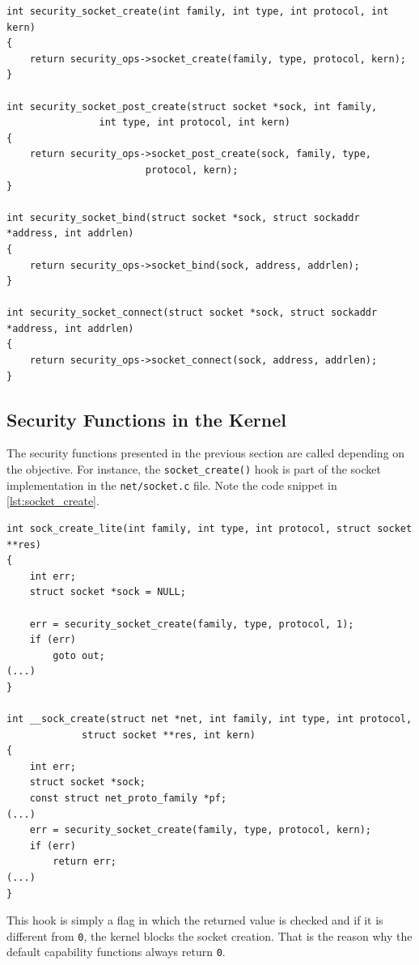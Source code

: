 \begin{lstlisting}[caption=Code snippet of  some security functions (Linux kernel v3.11), label=lst:security_func_code]
int security_socket_create(int family, int type, int protocol, int kern)
{
	return security_ops->socket_create(family, type, protocol, kern);
}

int security_socket_post_create(struct socket *sock, int family,
				int type, int protocol, int kern)
{
	return security_ops->socket_post_create(sock, family, type,
						protocol, kern);
}

int security_socket_bind(struct socket *sock, struct sockaddr *address, int addrlen)
{
	return security_ops->socket_bind(sock, address, addrlen);
}

int security_socket_connect(struct socket *sock, struct sockaddr *address, int addrlen)
{
	return security_ops->socket_connect(sock, address, addrlen);
}
\end{lstlisting}

\subsection{Security Functions in the Kernel}
\label{sec:security_func}

The security functions presented in the previous section are called depending on the objective. For instance, the \texttt{socket\_create()} hook is part of the socket implementation in the \texttt{net/socket.c} file. Note the code snippet in \autoref{lst:socket_create}.

\begin{lstlisting}[caption=Code snippet of the \texttt{socket\_create()} hook in socket implementation (Linux kernel v3.11), label=lst:socket_create]
int sock_create_lite(int family, int type, int protocol, struct socket **res)
{
	int err;
	struct socket *sock = NULL;

	err = security_socket_create(family, type, protocol, 1);
	if (err)
		goto out;
(...)
}

int __sock_create(struct net *net, int family, int type, int protocol,
			 struct socket **res, int kern)
{
	int err;
	struct socket *sock;
	const struct net_proto_family *pf;
(...)
	err = security_socket_create(family, type, protocol, kern);
	if (err)
		return err;
(...)
}
\end{lstlisting}

This hook is simply a flag in which the returned value is checked and if it is different from \texttt{0}, the kernel blocks the socket creation. That is the reason why the default capability functions always return \texttt{0}.
